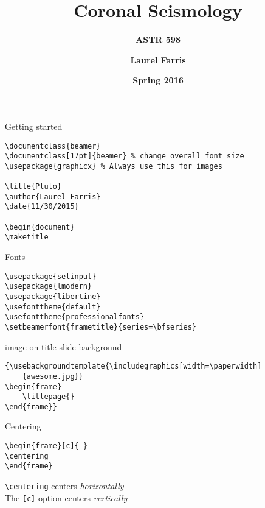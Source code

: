 \documentclass[9pt]{beamer}
\title{\textbf{Coronal Seismology}}
\subtitle{\textbf{ASTR 598}}
\date{\textbf{Spring 2016}}
\author{\textbf{Laurel Farris}}
\begin{document}
\begin{frame}[fragile=singleslide]{Getting started}
    \begin{verbatim}
\documentclass{beamer}
\documentclass[17pt]{beamer} % change overall font size
\usepackage{graphicx} % Always use this for images

\title{Pluto}
\author{Laurel Farris}
\date{11/30/2015}

\begin{document}
\maketitle
    \end{verbatim}
\end{frame}%
\begin{frame}[fragile=singleslide]{Fonts}
    \begin{verbatim}
\usepackage{selinput}
\usepackage{lmodern}
\usepackage{libertine}
\usefonttheme{default}
\usefonttheme{professionalfonts}
\setbeamerfont{frametitle}{series=\bfseries}
    \end{verbatim}
\end{frame}%
\begin{frame}{image on title slide background}
    \begin{verbatim}
{\usebackgroundtemplate{\includegraphics[width=\paperwidth]
    {awesome.jpg}}
\begin{frame}
    \titlepage{}
\end{frame}}
    \end{verbatim}
\end{frame}%
\begin{frame}[fragile=singleslide]{Centering}
    \begin{verbatim}
\begin{frame}[c]{ }
\centering
\end{frame}
    \end{verbatim}

\verb|\centering| centers \emph{horizontally}\\
The \verb|[c]| option centers \emph{vertically}
\end{frame}%
\end{document}
